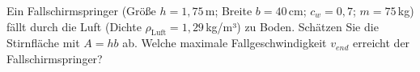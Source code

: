 \begin{ExerciseBlock}
Ein Fallschirmspringer (Größe $h=1,75\,$m; Breite $b=40\,$cm; $c_w = 0,7$; $m=75\,$kg) fällt durch die Luft (Dichte $\rho_\text{Luft} = 1,29\,$kg/m³) zu Boden. Schätzen Sie die Stirnfläche mit $A=hb$ ab. Welche maximale Fallgeschwindigkeit $v_{end}$ erreicht der Fallschirmspringer?
\begin{center}
\end{center}
\end{ExerciseBlock}
